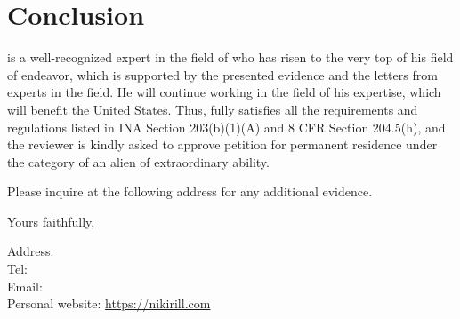 \section{Conclusion}
\label{sec:conclusion}

\dr is a well-recognized expert in the field of \dpcs who has risen to the very
top of his field of endeavor, which is supported by the presented evidence and
the letters from experts in the field. 
He will continue working in the field of his expertise, which will benefit
the United States. 
Thus, \dr fully satisfies all the requirements and regulations listed in INA
Section 203(b)(1)(A) and 8 CFR Section 204.5(h), and the reviewer is kindly
asked to approve \drs petition for permanent residence under the category of an
alien of extraordinary ability.

Please inquire at the following address for any additional evidence.

Yours faithfully,


\vspace{5em}
\drfull

Address: \\
Tel: \\
Email: \\
Personal website: \url{https://nikirill.com}